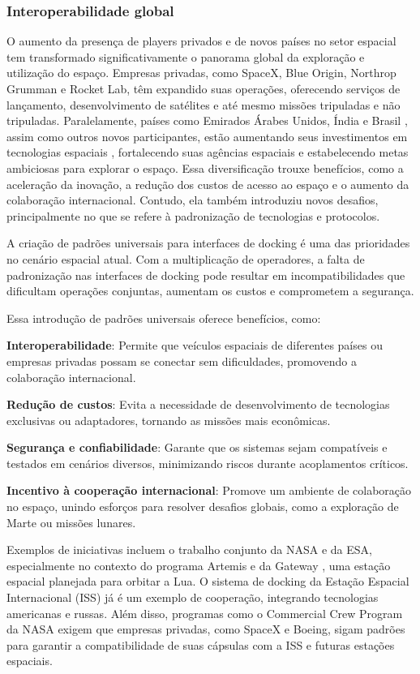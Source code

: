 \subsubsection{Interoperabilidade global}

O aumento da presença de players privados e de novos países no setor espacial tem transformado significativamente o panorama global da exploração e utilização do espaço. Empresas privadas, como SpaceX, Blue Origin, Northrop Grumman e Rocket Lab, têm expandido suas operações, oferecendo serviços de lançamento, desenvolvimento de satélites e até mesmo missões tripuladas e não tripuladas. Paralelamente, países como Emirados Árabes Unidos, Índia e Brasil \citep{senadoALADA}, assim como outros novos participantes, estão aumentando seus investimentos em tecnologias espaciais , fortalecendo suas agências espaciais e estabelecendo metas ambiciosas para explorar o espaço. Essa diversificação trouxe benefícios, como a aceleração da inovação, a redução dos custos de acesso ao espaço \citep{jones2018} e o aumento da colaboração internacional. Contudo, ela também introduziu novos desafios, principalmente no que se refere à padronização de tecnologias e protocolos.

A criação de padrões universais para interfaces \citep{nasaManualOfDocking2017} de docking é uma das prioridades no cenário espacial atual. Com a multiplicação de operadores, a falta de padronização nas interfaces de docking pode resultar em incompatibilidades que dificultam operações conjuntas, aumentam os custos e comprometem a segurança.

Essa introdução de padrões universais oferece benefícios, como:

\textbf{Interoperabilidade}: Permite que veículos espaciais de diferentes países ou empresas privadas possam se conectar sem dificuldades, promovendo a colaboração internacional.

\textbf{Redução de custos}: Evita a necessidade de desenvolvimento de tecnologias exclusivas ou adaptadores, tornando as missões mais econômicas.

\textbf{Segurança e confiabilidade}: Garante que os sistemas sejam compatíveis e testados em cenários diversos, minimizando riscos durante acoplamentos críticos.

\textbf{Incentivo à cooperação internacional}: Promove um ambiente de colaboração no espaço, unindo esforços para resolver desafios globais, como a exploração de Marte ou missões lunares.

Exemplos de iniciativas incluem o trabalho conjunto da NASA e da ESA, especialmente no contexto do programa Artemis e da Gateway \citep{nasaGateway}, uma estação espacial planejada para orbitar a Lua. O sistema de docking da Estação Espacial Internacional (ISS) já é um exemplo de cooperação, integrando tecnologias americanas e russas. Além disso, programas como o Commercial Crew Program da NASA exigem que empresas privadas, como SpaceX e Boeing, sigam padrões para garantir a compatibilidade de suas cápsulas com a ISS e futuras estações espaciais.
